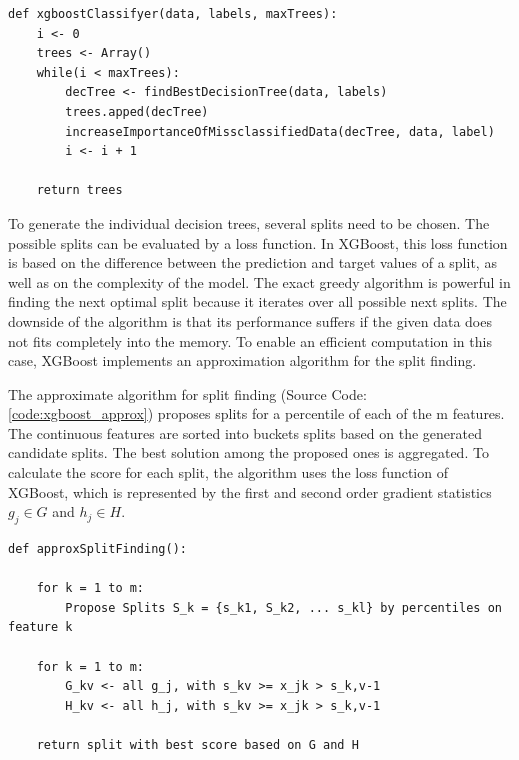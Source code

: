 \begin{lstlisting}[style=py, caption={Pseudocode: Basic XGBoost}, label={code:xgboost}]
def xgboostClassifyer(data, labels, maxTrees):
    i <- 0
    trees <- Array()
    while(i < maxTrees):
        decTree <- findBestDecisionTree(data, labels)
        trees.apped(decTree)
        increaseImportanceOfMissclassifiedData(decTree, data, label)
        i <- i + 1
    
    return trees
\end{lstlisting}

To generate the individual decision trees, several splits need to be chosen. The possible splits can be evaluated by a loss function. In XGBoost, this loss function is based on the difference between the prediction and target values of a split, as well as on the complexity of the model. The exact greedy algorithm is powerful in finding the next optimal split because it iterates over all possible next splits. The downside of the algorithm is that its performance suffers if the given data does not fits completely into the memory. To enable an efficient computation in this case, XGBoost implements an approximation algorithm for the split finding. \cite{chen2016xgboost}

The approximate algorithm for split finding (Source Code: \ref{code:xgboost_approx}) proposes splits for a percentile of each of the m features. The continuous features are sorted into buckets splits based on the generated candidate splits. The best solution among the proposed ones is aggregated. To calculate the score for each split, the algorithm uses the loss function of XGBoost, which is represented by the first and second order gradient statistics $g_j \in G$ and $h_j \in H$. 

\begin{lstlisting}[style=py, caption={Pseudocode: XGBoost - Approximate Algorithm for Split Finding \cite{chen2016xgboost} }, label={code:xgboost_approx}]
def approxSplitFinding():
    
    for k = 1 to m:
        Propose Splits S_k = {s_k1, S_k2, ... s_kl} by percentiles on feature k
    
    for k = 1 to m:
        G_kv <- all g_j, with s_kv >= x_jk > s_k,v-1
        H_kv <- all h_j, with s_kv >= x_jk > s_k,v-1
    
    return split with best score based on G and H
\end{lstlisting}








